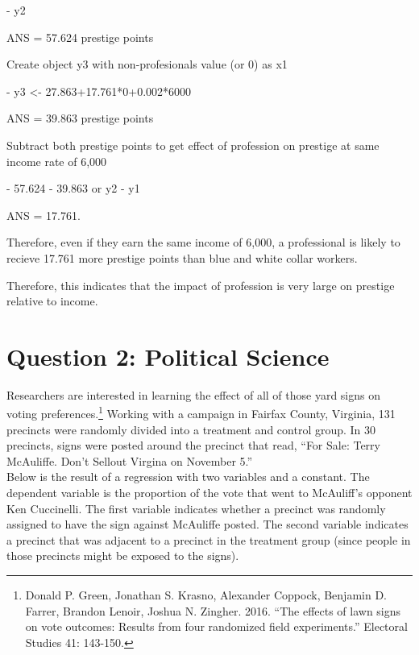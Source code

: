 \documentclass[12pt,letterpaper]{article}
\begin{document}
\begin{enumerate}
-	y2  

ANS = 57.624 prestige points 

Create object y3 with non-profesionals value (or 0) as x1

- y3 <- 27.863+17.761*0+0.002*6000 

ANS = 39.863 prestige points

Subtract both prestige points to get effect of profession on prestige at same income rate of 6,000

-	57.624 - 39.863 or y2 - y1

ANS = 17.761. 

Therefore, even if they earn the same income of 6,000, a professional is likely to recieve 17.761 more prestige points than blue and white collar workers. 

Therefore, this indicates that the impact of profession is very large on prestige relative to income. 
	
	
\end{enumerate}

\newpage

\section*{Question 2: Political Science}
\vspace{.25cm}
\noindent 	Researchers are interested in learning the effect of all of those yard signs on voting preferences.\footnote{Donald P. Green, Jonathan	S. Krasno, Alexander Coppock, Benjamin D. Farrer,	Brandon Lenoir, Joshua N. Zingher. 2016. ``The effects of lawn signs on vote outcomes: Results from four randomized field experiments.'' Electoral Studies 41: 143-150. } Working with a campaign in Fairfax County, Virginia, 131 precincts were randomly divided into a treatment and control group. In 30 precincts, signs were posted around the precinct that read, ``For Sale: Terry McAuliffe. Don't Sellout Virgina on November 5.'' \\

Below is the result of a regression with two variables and a constant.  The dependent variable is the proportion of the vote that went to McAuliff's opponent Ken Cuccinelli. The first variable indicates whether a precinct was randomly assigned to have the sign against McAuliffe posted. The second variable indicates
a precinct that was adjacent to a precinct in the treatment group (since people in those precincts might be exposed to the signs).  \\
\end{document}
